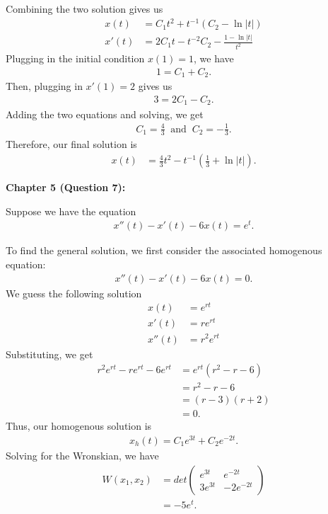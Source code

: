 \documentclass[12pt]{article}
\begin{document}
Combining the two solution gives us
\begin{align*}
    x(t)  & = C_1t^2 + t^{-1}(C_2 - \ln|t|)            \\
    x'(t) & = 2C_1t - t^{-2}C_2 - \frac{1-\ln|t|}{t^2}
\end{align*}
Plugging in the initial condition $x(1) = 1$, we have
\begin{align*}
    1 = C_1 + C_2. \tag{1}
\end{align*}
Then, plugging in $x'(1) = 2$ gives us
\begin{align*}
    3 = 2C_1 - C_2. \tag{2}
\end{align*}
Adding the two equations and solving, we get
\begin{align*}
    C_1 = \frac{4}{3} ~ \text{ and } ~ C_2 = -\frac{1}{3}.
\end{align*}
Therefore, our final solution is
\begin{align*}
    x(t) & = \frac{4}{3}t^2 - t^{-1}(\frac{1}{3} + \ln|t|).
\end{align*}

\noindent \textbf{Chapter 5 (Question 7):}

Suppose we have the equation
\begin{align*}
    x''(t) - x'(t) - 6x(t) = e^t.
\end{align*}

To find the general solution, we first consider the associated homogenous equation:
\begin{align*}
    x''(t) - x'(t) - 6x(t) = 0.
\end{align*}
We guess the following solution
\begin{align*}
    x(t)   & = e^{rt}    \\
    x'(t)  & = re^{rt}   \\
    x''(t) & = r^2e^{rt}
\end{align*}
Substituting, we get
\begin{align*}
    r^2e^{rt} - re^{rt} - 6e^{rt} & = e^{rt}(r^2-r-6) \\
                                  & = r^2 - r - 6     \\
                                  & = (r-3)(r+2)      \\
                                  & = 0.
\end{align*}
Thus, our homogenous solution is
\begin{align*}
    x_h(t) = C_1 e^{3t} + C_2 e^{-2t}.
\end{align*}
Solving for the Wronskian, we have
\begin{align*}
    W(x_1, x_2) & = det\begin{pmatrix} e^{3t} & e^{-2t} \\ 3e^{3t} & -2e^{-2t} \end{pmatrix} \\
                & = -5e^t.
\end{align*}
\end{document}

